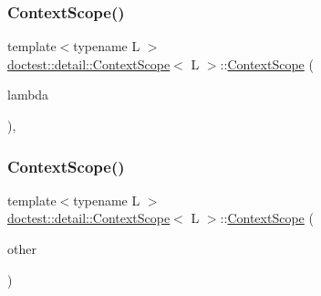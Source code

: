 \subsubsection{\texorpdfstring{Context\+Scope()}{ContextScope()}\hspace{0.1cm}{\footnotesize\ttfamily [1/2]}}
{\footnotesize\ttfamily template$<$typename L $>$ \\
\mbox{\hyperlink{classdoctest_1_1detail_1_1_context_scope}{doctest\+::detail\+::\+Context\+Scope}}$<$ L $>$\+::\mbox{\hyperlink{classdoctest_1_1detail_1_1_context_scope}{Context\+Scope}} (\begin{DoxyParamCaption}\item[{const L \&}]{lambda }\end{DoxyParamCaption})\hspace{0.3cm}{\ttfamily [inline]}, {\ttfamily [explicit]}}

\mbox{\label{classdoctest_1_1detail_1_1_context_scope_afca3228fdeb0e86257a21f826c4247ff}} 
\subsubsection{\texorpdfstring{Context\+Scope()}{ContextScope()}\hspace{0.1cm}{\footnotesize\ttfamily [2/2]}}
{\footnotesize\ttfamily template$<$typename L $>$ \\
\mbox{\hyperlink{classdoctest_1_1detail_1_1_context_scope}{doctest\+::detail\+::\+Context\+Scope}}$<$ L $>$\+::\mbox{\hyperlink{classdoctest_1_1detail_1_1_context_scope}{Context\+Scope}} (\begin{DoxyParamCaption}\item[{\mbox{\hyperlink{classdoctest_1_1detail_1_1_context_scope}{Context\+Scope}}$<$ L $>$ \&\&}]{other }\end{DoxyParamCaption})\hspace{0.3cm}{\ttfamily [inline]}}

\mbox{\label{classdoctest_1_1detail_1_1_context_scope_a1ee7d4702398ee8d0e80ab843aa260d7}} 
